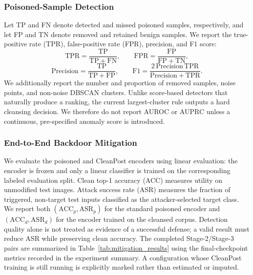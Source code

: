 \documentclass[10pt,journal]{IEEEtran}
\begin{document}
\subsubsection{Poisoned-Sample Detection}
Let TP and FN denote detected and missed poisoned samples, respectively,
and let FP and TN denote removed and retained benign samples. We report
the true-positive rate (TPR), false-positive rate (FPR), precision, and
F1 score:
\begin{equation}
    \mathrm{TPR}=\frac{\mathrm{TP}}{\mathrm{TP}+\mathrm{FN}},\qquad
    \mathrm{FPR}=\frac{\mathrm{FP}}{\mathrm{FP}+\mathrm{TN}},
    \label{eq:detection_rates}
\end{equation}
\begin{equation}
    \mathrm{Precision}=\frac{\mathrm{TP}}{\mathrm{TP}+\mathrm{FP}},\qquad
    \mathrm{F1}=\frac{2\,\mathrm{Precision}\,\mathrm{TPR}}
    {\mathrm{Precision}+\mathrm{TPR}}.
    \label{eq:detection_precision_f1}
\end{equation}
We additionally report the number and proportion of removed samples,
noise points, and non-noise DBSCAN clusters. Unlike score-based detectors
that naturally produce a ranking, the current largest-cluster rule outputs
a hard cleansing decision. We therefore do not report AUROC or AUPRC
unless a continuous, pre-specified anomaly score is introduced.

\subsubsection{End-to-End Backdoor Mitigation}
We evaluate the poisoned and CleanPost encoders using linear evaluation:
the encoder is frozen and only a linear classifier is trained on the
corresponding labeled evaluation split. Clean top-1 accuracy (ACC)
measures utility on unmodified test images. Attack success rate (ASR)
measures the fraction of triggered, non-target test inputs classified as
the attacker-selected target class. We report both $(\mathrm{ACC}_p,
\mathrm{ASR}_p)$ for the standard poisoned encoder and
$(\mathrm{ACC}_d,\mathrm{ASR}_d)$ for the encoder trained on the cleansed
corpus. Detection quality alone is not treated as evidence of a successful
defense; a valid result must reduce ASR while preserving clean accuracy.
The completed Stage-2/Stage-3 pairs are summarized in
Table~\ref{tab:mitigation_results} using the final-checkpoint metrics
recorded in the experiment summary. A configuration whose CleanPost
training is still running is explicitly marked rather than estimated or
imputed.
\end{document}

